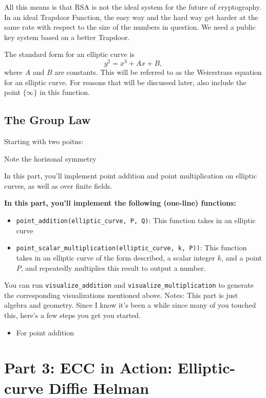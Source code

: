 \documentclass{article}
\begin{document}
All this means is that RSA is not the ideal system for the future of cryptography. In an ideal Trapdoor Function, the easy way and the hard way get harder at the same rate with respect to the size of the numbers in question. We need a public key system based on a better Trapdoor.



The standard form for an elliptic curve is $$y^{2} = x^{3} + Ax + B,$$ where $A$ and $B$ are constants.  This will be referred to as the Weierstrass
equation for an elliptic curve. For reasons that will be discussed later, also include the point $\{\infty\}$ in this function.

\subsection*{The Group Law}
    Starting with two poitns: 


    Note the horizonal symmetry


\begin{tcolorbox}
    In this part, you'll implement point addition and point multiplication on elliptic curves, as well as over finite fields.

    
    \textbf{In this part, you'll implement the following (one-line) functions:}
    \begin{itemize}
        \item \lstinline{point_addition(elliptic_curve, P, Q)}: This function takes in an elliptic curve 
        \item \lstinline{point_scalar_multiplication(elliptic_curve, k, P))}: This function takes in an elliptic curve of the form described, a scalar integer $k$, and a point $P$, and repeatedly multiplies this result to output a number.
    \end{itemize}
    You can run \lstinline{visualize_addition} and \lstinline{visualize_multiplication} to generate the corresponding visualizations mentioned above. 
    Notes: This part is just algebra and geometry. Since I know it's been a while since many of you touched this, here's a few steps you get you started.
    \begin{itemize}
        \item For point addition
    \end{itemize}
    
\end{tcolorbox}

\section*{Part 3: ECC in Action: Elliptic-curve Diffie Helman}
\end{document}
